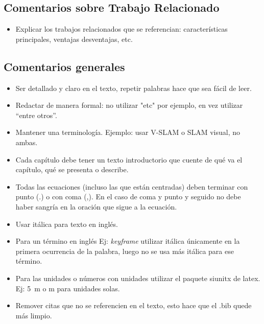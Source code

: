 \documentclass[a4paper,	11pt]{article}
\begin{document}
\subsection{Comentarios sobre Trabajo Relacionado}
\begin{itemize}
    \item Explicar los trabajos relacionados que se referencian: características principales, ventajas desventajas, etc.
\end{itemize}


\subsection{Comentarios generales}
%
\begin{itemize}
    \item Ser detallado y claro en el texto, repetir palabras hace que sea fácil de leer.

    \item Redactar de manera formal: no utilizar "etc" por ejemplo, en vez utilizar ``entre otros''.

    \item Mantener una terminología. Ejemplo: usar V-SLAM o SLAM visual, no ambas.

    \item Cada capítulo debe tener un texto introductorio que cuente de qué va el capítulo, qué se presenta o describe.
    
    \item Todas las ecuaciones (incluso las que están centradas) deben terminar con punto (.) o con coma (,). En el caso de coma y punto y seguido no debe haber sangría en la oración que sigue a la ecuación.

    \item Usar itálica para texto en inglés.

    \item Para un término en inglés Ej: \emph{keyframe} utilizar itálica únicamente en la primera ocurrencia de la palabra, luego no se usa más itálica para ese término.

    \item Para las unidades o números con unidades utilizar el paquete siunitx de latex. Ej: \SI{5}{\meter} o \si{\meter} para unidades solas.

    \item Remover citas que no se referencien en el texto, esto hace que el .bib quede más limpio.
\end{itemize}
\end{document}
